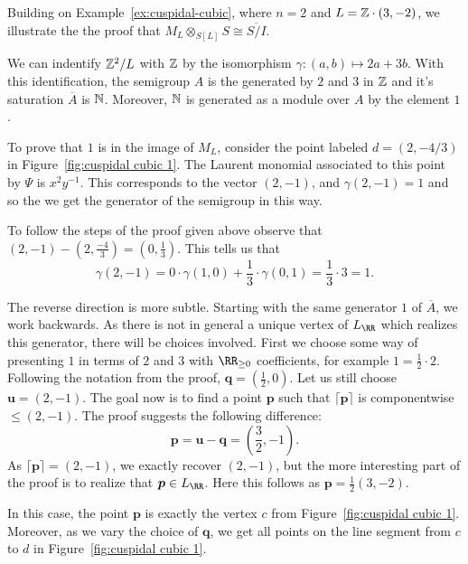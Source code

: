 \documentclass{amsart}
\begin{document}
\begin{example}
  Building on Example~\ref{ex:cuspidal-cubic}, where $n=2$ and $L=\mathbb Z\cdot (3,-2)$, we  illustrate the the proof that $M_L \otimes_{S[L]} S \cong \overline{S/I}$.

  We can  indentify $\mathbb Z^2/L$ with $\mathbb Z$ by the isomorphism $\gamma:(a,b)\mapsto 2a+3b$.  With this identification, the semigroup $A$ is the generated by $2$ and $3$ in $\mathbb Z$ and it's saturation $\overline{A}$ is $\mathbb N$. Moreover, $\mathbb N$ is generated as a module over $A$ by the  element $1$.

To prove that $1$ is in the image of $M_L$, consider the point labeled $d=(2,-4/3)$ in Figure~\ref{fig:cuspidal cubic 1}. The Laurent monomial associated to this point by $\Psi$ is $x^2y^{-1}$.
  This corresponds to the vector $(2,-1)$, and $\gamma(2,-1)=1$ and so the we get the generator of the semigroup in this way.
  
  To follow the steps of the proof given above observe that $(2,-1)-(2,\frac{-4}{3})=(0,\frac{1}{3})$. This tells us that
  \[\gamma(2,-1) = 0\cdot \gamma(1,0) + \frac{1}{3}\cdot \gamma(0,1)=\frac{1}{3}\cdot 3 = 1.\]

  The reverse direction is more subtle. Starting with the same generator $1$ of $\overline{A}$, we work backwards. As there is not in general a unique vertex of $L_{\RR}$ which realizes this generator, there will be choices involved.
  First we choose some way of presenting $1$ in terms of $2$ and $3$ with $\RR_{\geq 0}$ coefficients, for example $1=\frac{1}{2}\cdot 2$.
 Following the notation from the proof, $\mathbf{q}=(\frac{1}{2},0)$. Let us still choose $\bm{u}=(2,-1)$.
  The goal now is to find a point $\bm{p}$ such that $\lceil \bm{p} \rceil$ is componentwise $\leq (2,-1)$.
  The proof suggests the following difference:
  \[\bm{p}=\bm{u}-\bm{q} = (\frac{3}{2},-1).\]
  As $\lceil \bm{p} \rceil = (2,-1)$, we exactly recover $(2,-1)$, but the more interesting part of the proof is to realize that $\bm{p}\in L_{\RR}$. Here this follows as $\bm{p}=\frac{1}{2}(3,-2)$.

  In this case, the point $\bm{p}$ is exactly the vertex $c$ from Figure~\ref{fig:cuspidal cubic 1}. Moreover, as we vary the choice of $\bm{q}$, we get all points on the line segment from $c$ to $d$ in Figure~\ref{fig:cuspidal cubic 1}. 
\end{example}


\ifdefined\whole
\else


\fi
\end{document}

